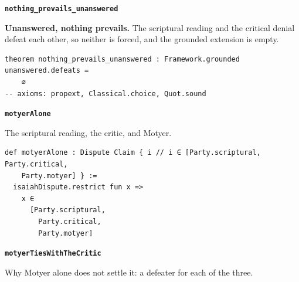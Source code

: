\documentclass[11pt]{article}
\begin{document}
\par\medskip\noindent\textbf{\texttt{nothing\_\allowbreak{}prevails\_\allowbreak{}unanswered}}\par\nobreak\noindent
\textbf{Unanswered, nothing prevails.} The scriptural reading and the critical denial defeat each other, so neither is forced, and the grounded extension is empty.

{\small\begin{verbatim}
theorem nothing_prevails_unanswered : Framework.grounded unanswered.defeats =
    ∅
-- axioms: propext, Classical.choice, Quot.sound
\end{verbatim}}
\par\medskip\noindent\textbf{\texttt{motyer\allowbreak{}Alone}}\par\nobreak\noindent
The scriptural reading, the critic, and Motyer.

{\small\begin{verbatim}
def motyerAlone : Dispute Claim { i // i ∈ [Party.scriptural, Party.critical,
    Party.motyer] } :=
  isaiahDispute.restrict fun x =>
    x ∈
      [Party.scriptural,
        Party.critical,
        Party.motyer]
\end{verbatim}}
\par\medskip\noindent\textbf{\texttt{motyer\allowbreak{}Ties\allowbreak{}With\allowbreak{}The\allowbreak{}Critic}}\par\nobreak\noindent
Why Motyer alone does not settle it: a defeater for each of the three.
\end{document}
